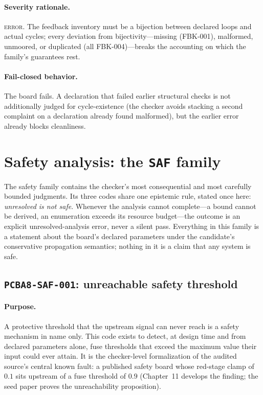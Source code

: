 \paragraph{Severity rationale.} \textsc{error}. The feedback inventory must be a bijection between declared loops and actual cycles; every deviation from bijectivity---missing (FBK-001), malformed, unmoored, or duplicated (all FBK-004)---breaks the accounting on which the family's guarantees rest.

\paragraph{Fail-closed behavior.} The board fails. A declaration that failed earlier structural checks is not additionally judged for cycle-existence (the checker avoids stacking a second complaint on a declaration already found malformed), but the earlier error already blocks cleanliness.

\section{Safety analysis: the \texttt{SAF} family}\label{ch07:sec:saf}

The safety family contains the checker's most consequential and most carefully bounded judgments. Its three codes share one epistemic rule, stated once here: \emph{unresolved is not safe}. Whenever the analysis cannot complete---a bound cannot be derived, an enumeration exceeds its resource budget---the outcome is an explicit unresolved-analysis error, never a silent pass. Everything in this family is a statement about the board's declared parameters under the candidate's conservative propagation semantics; nothing in it is a claim that any system is safe.

\subsection{\texttt{PCBA8-SAF-001}: unreachable safety threshold}\label{ch07:sub:saf001}

\paragraph{Purpose.} A protective threshold that the upstream signal can never reach is a safety mechanism in name only. This code exists to detect, at design time and from declared parameters alone, fuse thresholds that exceed the maximum value their input could ever attain. It is the checker-level formalization of the audited source's central known fault: a published safety board whose red-stage clamp of $0.1$ sits upstream of a fuse threshold of $0.9$ (Chapter~11 develops the finding; the seed paper proves the unreachability proposition).

